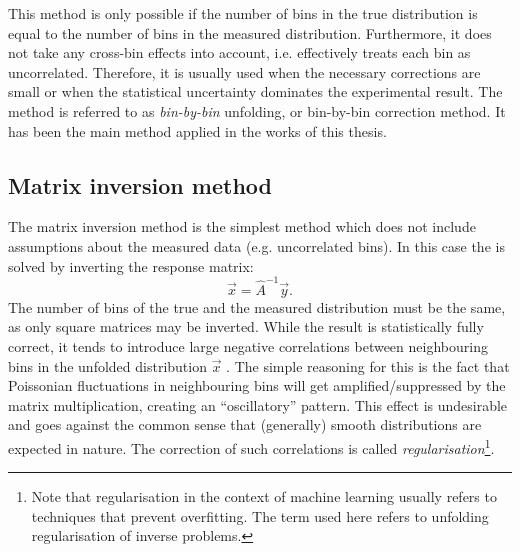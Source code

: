 This method is only possible if the number of bins in the true distribution is equal to the number of bins in the measured distribution.
Furthermore, it does not take any cross-bin effects into account, i.e. effectively treats each bin as uncorrelated.
Therefore, it is usually used when the necessary corrections are small or when the statistical uncertainty dominates the experimental result.
The method is referred to as \textit{bin-by-bin} unfolding, or bin-by-bin correction method.
It has been the main method applied in the works of this thesis.

\subsection{Matrix inversion method}
The matrix inversion method is the simplest method which does not include assumptions about the measured data (e.g. uncorrelated bins).
In this case the  is solved by inverting the response matrix:
\begin{equation}
    \vec{x} = \hat{A}^{-1}\vec{y}.
\end{equation}
The number of bins of the true and the measured distribution must be the same, as only square matrices may be inverted.
While the result is statistically fully correct, it tends to introduce large negative correlations between neighbouring bins in the unfolded distribution $\vec{x}$ \cite{Schmitt:2016orm}.
The simple reasoning for this is the fact that Poissonian fluctuations in neighbouring bins will get amplified/suppressed by the matrix multiplication, creating an ``oscillatory'' pattern.
This effect is undesirable and goes against the common sense that (generally) smooth distributions are expected in nature.
The correction of such correlations is called \textit{regularisation}\footnote{Note that regularisation in the context of machine learning usually refers to techniques that prevent overfitting.
The term used here refers to unfolding regularisation of inverse problems.
}.


